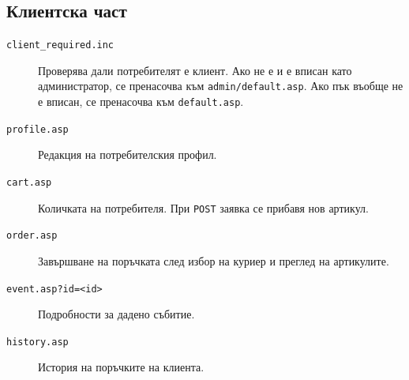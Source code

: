 \documentclass[a4paper,10pt, leqno]{article}
\newcommand{\File}[1] {\texttt{#1}}
\begin{document}
    \subsection{Клиентска част}
    \begin{description}
        \item[\File{client\_required.inc}]
            Проверява дали потребителят е клиент. Ако не е и е вписан като администратор, се пренасочва към \File{admin/default.asp}.
            Ако пък въобще не е вписан, се пренасочва към \File{default.asp}.
        \item[\File{profile.asp}]
            Редакция на потребителския профил.
        \item[\File{cart.asp}]
            Количката на потребителя.
            При \texttt{POST} заявка се прибавя нов артикул.
        \item[\File{order.asp}]
            Завършване на поръчката след избор на куриер и преглед на артикулите.
        \item[\File{event.asp?id=<id>}]
            Подробности за дадено събитие.
        \item[\File{history.asp}]
            История на поръчките на клиента.
    \end{description}

    
\end{document}
